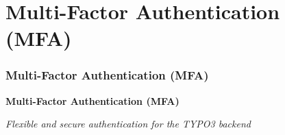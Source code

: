 %

\section{Multi-Factor Authentication (MFA)}
\begin{frame}[fragile]
	\frametitle{Multi-Factor Authentication (MFA)}

	\begin{center}\huge{\color{typo3darkgrey}\textbf{Multi-Factor Authentication (MFA)}}\end{center}
	\begin{center}\large{\textit{Flexible and secure authentication for the TYPO3 backend}}\end{center}

\end{frame}

